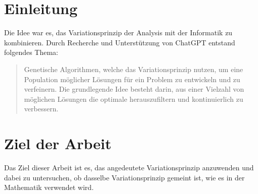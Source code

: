 %
%
%
%
\section{Einleitung
\label{buch:paper:section:introduction}}
Die Idee war es, das Variationsprinzip der Analysis mit der Informatik zu kombinieren. 
Durch Recherche und Unterstützung von ChatGPT entstand folgendes Thema:

\begin{quote}
    Genetische Algorithmen, welche das Variationsprinzip nutzen, um eine Population 
    möglicher Lösungen für ein Problem zu entwickeln und zu verfeinern. 
    Die grundlegende Idee besteht darin, aus einer Vielzahl von möglichen Lösungen 
    die optimale herauszufiltern und kontinuierlich zu verbessern.
\end{quote}

\section{Ziel der Arbeit
\label{buch:paper:varalg:section:goal}} 
Das Ziel dieser Arbeit ist es, das angedeutete Variationsprinzip anzuwenden und dabei 
zu untersuchen, ob dasselbe Variationsprinzip gemeint ist, wie es in der Mathematik 
verwendet wird.
